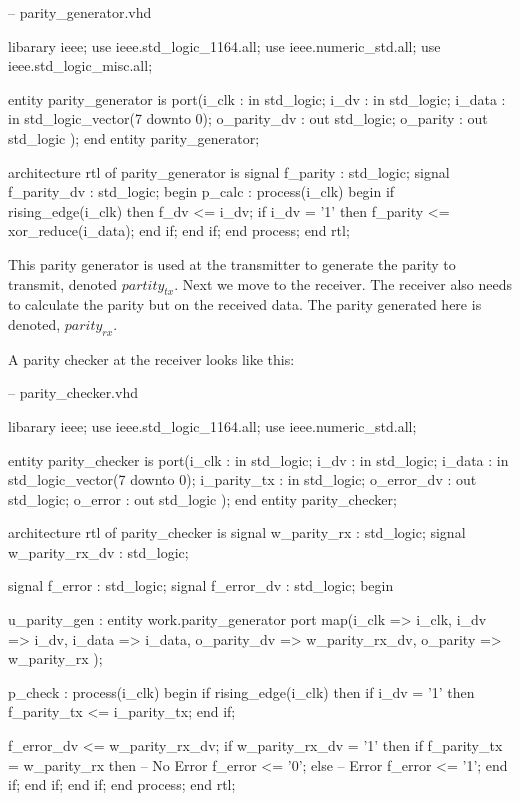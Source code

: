 \begin{VHDLlisting}[tabsize=4]
-- parity_generator.vhd

libarary ieee;
	use ieee.std_logic_1164.all;
	use ieee.numeric_std.all;
	use ieee.std_logic_misc.all;
	
entity parity_generator is
	port(i_clk       : in    std_logic;
		 i_dv        : in    std_logic;
		 i_data      : in    std_logic_vector(7 downto 0);
		 o_parity_dv :   out std_logic;
		 o_parity    :   out std_logic
	);
end entity parity_generator;

architecture rtl of parity_generator is
	signal f_parity    : std_logic;
	signal f_parity_dv : std_logic;
begin
	p_calc : process(i_clk)
	begin
		if rising_edge(i_clk) then
			f_dv <= i_dv;
			if i_dv = '1' then
				f_parity <= xor_reduce(i_data);
			end if;
		end if;	
	end process;
end rtl;
\end{VHDLlisting}

This parity generator is used at the transmitter to generate the parity to transmit, denoted $partity_{tx}$. Next we move to the receiver. The receiver also needs to calculate the parity but on the received data. The parity generated here is denoted, $parity_{rx}$.

A parity checker at the receiver looks like this:

\begin{VHDLlisting}[tabsize=4]
-- parity_checker.vhd

libarary ieee;
	use ieee.std_logic_1164.all;
	use ieee.numeric_std.all;
	
entity parity_checker is
	port(i_clk       : in    std_logic;
		 i_dv        : in    std_logic;
		 i_data      : in    std_logic_vector(7 downto 0);
		 i_parity_tx : in    std_logic;
		 o_error_dv  :   out std_logic;
		 o_error     :   out std_logic
	);
end entity parity_checker;

architecture rtl of parity_checker is
	signal w_parity_rx    : std_logic;
	signal w_parity_rx_dv : std_logic;
	
	signal f_error        : std_logic;
	signal f_error_dv     : std_logic;
begin
	
	u_parity_gen : entity work.parity_generator
	port map(i_clk          => i_clk,
	         i_dv           => i_dv,
	         i_data         => i_data,
	         o_parity_dv    => w_parity_rx_dv,
	         o_parity       => w_parity_rx
	);
	
	p_check : process(i_clk)
	begin
		if rising_edge(i_clk) then
			if i_dv = '1' then	
				f_parity_tx <= i_parity_tx;
			end if;
			
			f_error_dv <= w_parity_rx_dv;
			if w_parity_rx_dv = '1' then
				if f_parity_tx = w_parity_rx then
					-- No Error
					f_error <= '0';
				else
					-- Error
					f_error <= '1';
				end if;			
			end if;
		end if;	
	end process;
end rtl;
\end{VHDLlisting}

